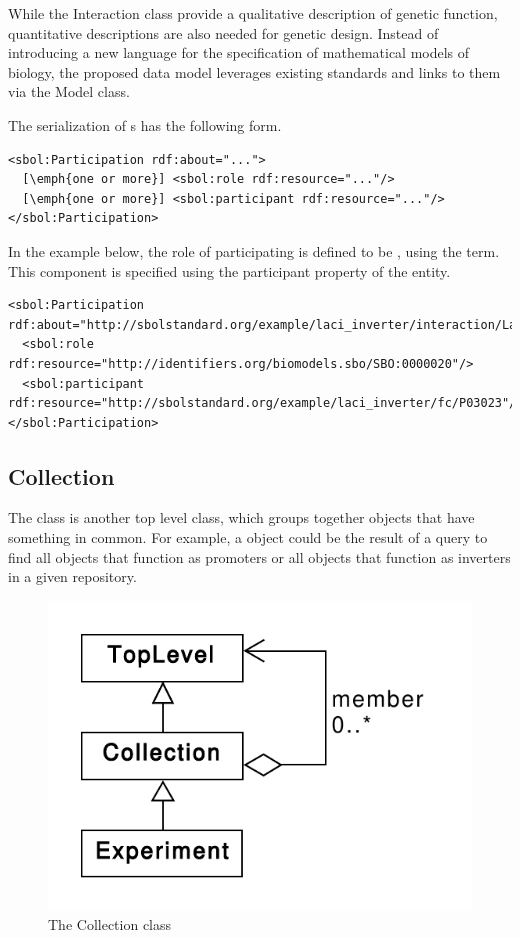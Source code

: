 While the Interaction class provide a qualitative description of genetic function, quantitative descriptions are also needed for genetic design. Instead of introducing a new language for the specification of mathematical models of biology, the proposed data model leverages existing standards and links to them via the Model class. 

The serialization of s has the following form.
\begin{lstlisting}
<sbol:Participation rdf:about="...">
  [\emph{one or more}] <sbol:role rdf:resource="..."/>
  [\emph{one or more}] <sbol:participant rdf:resource="..."/>
</sbol:Participation>
\end{lstlisting}

In the example below, the role of participating  is defined to be , using the  term. This component is specified using the participant property of the  entity.
\begin{lstlisting}
<sbol:Participation rdf:about="http://sbolstandard.org/example/laci_inverter/interaction/LacI_pLacI/participation/P03023">
  <sbol:role rdf:resource="http://identifiers.org/biomodels.sbo/SBO:0000020"/>
  <sbol:participant rdf:resource="http://sbolstandard.org/example/laci_inverter/fc/P03023"/>
</sbol:Participation>
\end{lstlisting}

\subsection {Collection}
\label{sec:Collection}
The  class is another top level class, which groups together  objects that have something in common. For example, a  object could be the result of a query to find all  objects that function as promoters or all  objects that function as inverters in a given repository. 

\begin{figure}[ht]
\begin{center}
\includegraphics[scale=0.6]{uml/collection}
\caption[]{The Collection class}
\label{uml:collection}
\end{center}
\end{figure}

